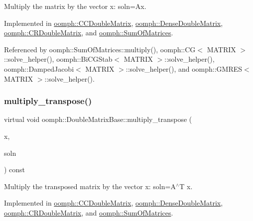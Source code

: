 Multiply the matrix by the vector x\+: soln=Ax. 



Implemented in \hyperlink{classoomph_1_1CCDoubleMatrix_add24c25e344b84fb5b732e294af5e8b2}{oomph\+::\+C\+C\+Double\+Matrix}, \hyperlink{classoomph_1_1DenseDoubleMatrix_ab575dfefa0bdd8f495453baa5575a4a0}{oomph\+::\+Dense\+Double\+Matrix}, \hyperlink{classoomph_1_1CRDoubleMatrix_a54b75960df52e3aebd21aaab20e9869d}{oomph\+::\+C\+R\+Double\+Matrix}, and \hyperlink{classoomph_1_1SumOfMatrices_ae6c97ff92220835df3c3eeb1b0a85cc5}{oomph\+::\+Sum\+Of\+Matrices}.



Referenced by oomph\+::\+Sum\+Of\+Matrices\+::multiply(), oomph\+::\+C\+G$<$ M\+A\+T\+R\+I\+X $>$\+::solve\+\_\+helper(), oomph\+::\+Bi\+C\+G\+Stab$<$ M\+A\+T\+R\+I\+X $>$\+::solve\+\_\+helper(), oomph\+::\+Damped\+Jacobi$<$ M\+A\+T\+R\+I\+X $>$\+::solve\+\_\+helper(), and oomph\+::\+G\+M\+R\+E\+S$<$ M\+A\+T\+R\+I\+X $>$\+::solve\+\_\+helper().

\mbox{\label{classoomph_1_1DoubleMatrixBase_a843d44405b70da1d96b43218a21e6ffc}} 
\subsubsection{\texorpdfstring{multiply\+\_\+transpose()}{multiply\_transpose()}}
{\footnotesize\ttfamily virtual void oomph\+::\+Double\+Matrix\+Base\+::multiply\+\_\+transpose (\begin{DoxyParamCaption}\item[{const \hyperlink{classoomph_1_1DoubleVector}{Double\+Vector} \&}]{x,  }\item[{\hyperlink{classoomph_1_1DoubleVector}{Double\+Vector} \&}]{soln }\end{DoxyParamCaption}) const\hspace{0.3cm}{\ttfamily [pure virtual]}}



Multiply the transposed matrix by the vector x\+: soln=A$^\wedge$T x. 



Implemented in \hyperlink{classoomph_1_1CCDoubleMatrix_a582352912b0a7e097f9ac31c5054beed}{oomph\+::\+C\+C\+Double\+Matrix}, \hyperlink{classoomph_1_1DenseDoubleMatrix_a7cc35997d87b4ee7b77fcaaf85eeeaec}{oomph\+::\+Dense\+Double\+Matrix}, \hyperlink{classoomph_1_1CRDoubleMatrix_a42fb274c98ccf4c2a542ca15343fcc0e}{oomph\+::\+C\+R\+Double\+Matrix}, and \hyperlink{classoomph_1_1SumOfMatrices_a0028fb64f602aa07ff557b0a11a1c659}{oomph\+::\+Sum\+Of\+Matrices}.

